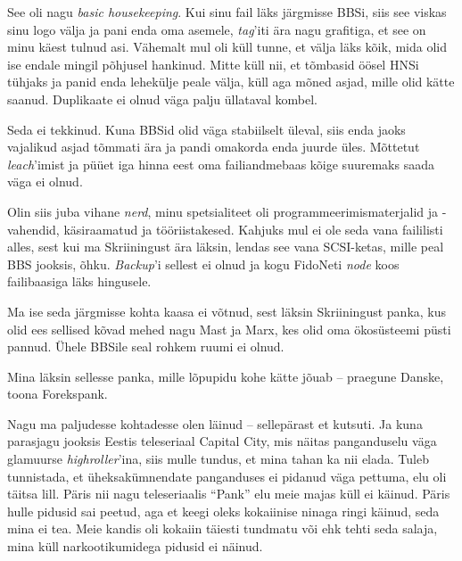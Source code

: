 See oli nagu \emph{basic housekeeping}. Kui sinu fail läks 
järgmisse BBSi, siis see viskas sinu logo välja ja pani enda oma 
asemele, \emph{tag}'iti ära nagu grafitiga, et see on 
minu käest tulnud asi. Vähemalt mul oli küll tunne, et välja läks 
kõik, mida olid ise endale mingil põhjusel hankinud. Mitte küll nii, et 
tõmbasid öösel HNSi tühjaks ja 
panid enda lehekülje peale välja, küll aga mõned asjad, mille olid kätte 
saanud. Duplikaate ei olnud väga palju üllataval kombel.


Seda ei tekkinud. Kuna BBSid olid väga stabiilselt üleval, siis enda jaoks 
vajalikud asjad tõmmati
ära ja pandi omakorda enda juurde üles. Mõttetut \emph{leach}'imist ja püüet 
iga hinna eest oma failiandmebaas kõige suuremaks saada 
väga ei olnud. 


Olin siis juba vihane \emph{nerd}, minu spetsialiteet oli 
programmeerimismaterjalid ja -vahendid, käsiraamatud ja
tööriistakesed. 
Kahjuks mul ei ole seda vana faililisti alles, sest kui ma Skriiningust ära 
läksin, lendas see vana SCSI-ketas, 
mille peal BBS jooksis, õhku. \emph{Backup}'i sellest ei olnud ja 
kogu FidoNeti \emph{node} koos failibaasiga läks hingusele.

Ma ise seda järgmisse kohta kaasa ei võtnud, sest läksin Skriiningust panka, 
kus 
olid ees sellised kõvad mehed nagu Mast ja 
Marx, kes 
olid oma ökosüsteemi püsti pannud. Ühele BBSile seal rohkem ruumi ei olnud. 


Mina läksin sellesse panka, mille lõpupidu kohe 
kätte jõuab -- 
praegune Danske, toona Forekspank. 


Nagu ma paljudesse kohtadesse olen läinud -- sellepärast et kutsuti. Ja 
kuna parasjagu jooksis Eestis teleseriaal Capital City, mis 
näitas panganduselu väga glamuurse \emph{highroller}'ina, siis mulle tundus, 
et mina tahan ka nii elada. Tuleb tunnistada, et üheksakümnendate panganduses  
ei pidanud väga pettuma, elu oli täitsa lill. Päris nii nagu 
teleseriaalis \enquote{Pank} elu meie majas küll ei käinud. 
Päris hulle pidusid sai peetud, aga et keegi oleks kokaiinise  
ninaga ringi käinud, seda mina ei tea. Meie kandis oli kokaiin täiesti 
tundmatu või ehk tehti seda salaja, mina küll
narkootikumidega pidusid ei näinud.

